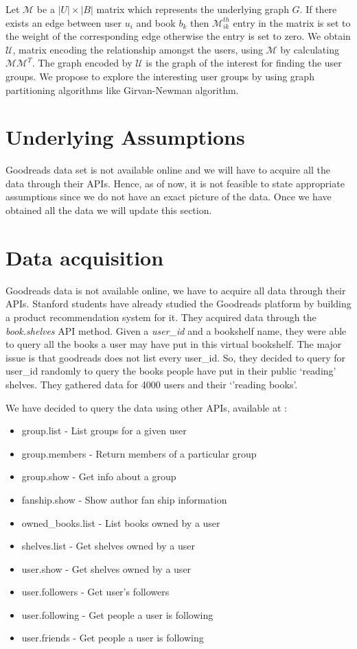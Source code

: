 \documentclass[11pt]{article}
\begin{document}
Let $\mathcal{M}$ be a $|U| \times |B|$ matrix which represents the underlying graph $G$. If there exists an edge between user $u_i$ and book $b_k$ then $\mathcal{M}_{ik}^{th}$ entry in the matrix is set to the weight of the corresponding edge otherwise the entry is set to zero. We obtain $\mathcal{U}$, matrix encoding the relationship amongst the users, using $\mathcal{M}$ by calculating $\mathcal{M}\mathcal{M}^{T}$. The graph encoded by $\mathcal{U}$ is the graph of the interest for finding the user groups. We propose to explore the interesting user groups by using graph partitioning algorithms like Girvan-Newman algorithm.


\section{Underlying Assumptions}

Goodreads data set is not available online and we will have to acquire all the data through their APIs. Hence, as of now, it is not feasible to state appropriate assumptions since we do not have an exact picture of the data. Once we have obtained all the data we will update this section.

\section{Data acquisition}
\label{sec:data_acquisition}
Goodreads data is not available online, we have to acquire all data through their APIs. Stanford students have already studied the Goodreads platform by building a product recommendation system for it\cite{stanford:goodreads}. They acquired data through the \textit{book.shelves} API method. Given a \textit{user\_id} and a bookshelf name, they were able to query all the books a user may have put in this virtual bookshelf. The major issue is that goodreads does not list every user\_id. So, they decided to query for user\_id randomly to query the books people have put in their public ‘reading' shelves. They gathered data for 4000 users and their `'reading books'.

We have decided to query the data using other APIs, available at \cite{goodreads:api}:
\begin{itemize}
\item group.list - List groups for a given user
\item group.members - Return members of a particular group
\item group.show - Get info about a group
\item fanship.show - Show author fan ship information
\item owned\_books.list - List books owned by a user
\item shelves.list - Get shelves owned by a user
\item user.show - Get shelves owned by a user
\item user.followers - Get user's followers
\item user.following - Get people a user is following
\item user.friends - Get people a user is following
\end{itemize}
\end{document}
